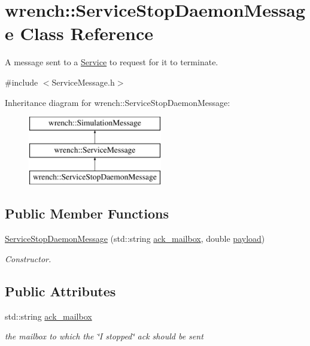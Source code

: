 \hypertarget{classwrench_1_1_service_stop_daemon_message}{}\section{wrench\+:\+:Service\+Stop\+Daemon\+Message Class Reference}
\label{classwrench_1_1_service_stop_daemon_message}


A message sent to a \hyperlink{classwrench_1_1_service}{Service} to request for it to terminate.  




{\ttfamily \#include $<$Service\+Message.\+h$>$}

Inheritance diagram for wrench\+:\+:Service\+Stop\+Daemon\+Message\+:\begin{figure}[H]
\begin{center}
\leavevmode
\includegraphics[height=3.000000cm]{classwrench_1_1_service_stop_daemon_message}
\end{center}
\end{figure}
\subsection*{Public Member Functions}
\begin{DoxyCompactItemize}
\item 
\hyperlink{classwrench_1_1_service_stop_daemon_message_a61ec12946b3b303d9e57bb4fcbf654ec}{Service\+Stop\+Daemon\+Message} (std\+::string \hyperlink{classwrench_1_1_service_stop_daemon_message_a29cf68ed26915ab2efbe2cdec6c74bc3}{ack\+\_\+mailbox}, double \hyperlink{classwrench_1_1_simulation_message_a914f2732713f7c02898e66f05a7cb8a1}{payload})
\begin{DoxyCompactList}\small\item\em Constructor. \end{DoxyCompactList}\end{DoxyCompactItemize}
\subsection*{Public Attributes}
\begin{DoxyCompactItemize}
\item 
\mbox{\label{classwrench_1_1_service_stop_daemon_message_a29cf68ed26915ab2efbe2cdec6c74bc3}} 
std\+::string \hyperlink{classwrench_1_1_service_stop_daemon_message_a29cf68ed26915ab2efbe2cdec6c74bc3}{ack\+\_\+mailbox}
\begin{DoxyCompactList}\small\item\em the mailbox to which the \char`\"{}\+I stopped\char`\"{} ack should be sent \end{DoxyCompactList}\end{DoxyCompactItemize}
